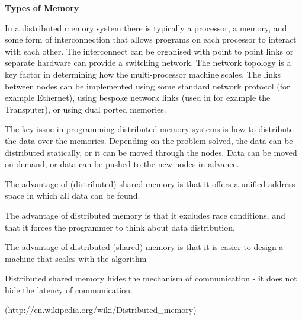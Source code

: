 \documentclass[12pt, ]{article}
\begin{document}
\vspace*{2em}
\noindent \textbf{Types of Memory}

In a distributed memory system there is typically a processor, a memory, and some form of interconnection that allows programs on each processor to interact with each other. The interconnect can be organised with point to point links or separate hardware can provide a switching network. The network topology is a key factor in determining how the multi-processor machine scales. The links between nodes can be implemented using some standard network protocol (for example Ethernet), using bespoke network links (used in for example the Transputer), or using dual ported memories.

The key issue in programming distributed memory systems is how to distribute the data over the memories. Depending on the problem solved, the data can be distributed statically, or it can be moved through the nodes. Data can be moved on demand, or data can be pushed to the new nodes in advance. 

The advantage of (distributed) shared memory is that it offers a unified address space in which all data can be found.

The advantage of distributed memory is that it excludes race conditions, and that it forces the programmer to think about data distribution.

The advantage of distributed (shared) memory is that it is easier to design a machine that scales with the algorithm

Distributed shared memory hides the mechanism of communication - it does not hide the latency of communication.

(http://en.wikipedia.org/wiki/Distributed\_memory)
\end{document}
